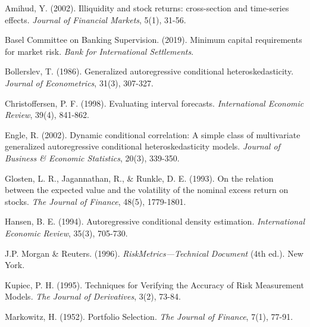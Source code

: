 \documentclass[11pt,a4paper]{article}
\begin{document}
\begin{description}[leftmargin=1cm, labelwidth=0cm, labelindent=0cm, itemindent=-1cm]

    \item Amihud, Y. (2002). Illiquidity and stock returns: cross-section and time-series effects. \textit{Journal of Financial Markets}, 5(1), 31-56.

    \item Basel Committee on Banking Supervision. (2019). Minimum capital requirements for market risk. \textit{Bank for International Settlements}.

    \item Bollerslev, T. (1986). Generalized autoregressive conditional heteroskedasticity. \textit{Journal of Econometrics}, 31(3), 307-327.

    \item Christoffersen, P. F. (1998). Evaluating interval forecasts. \textit{International Economic Review}, 39(4), 841-862.

    \item Engle, R. (2002). Dynamic conditional correlation: A simple class of multivariate generalized autoregressive conditional heteroskedasticity models. \textit{Journal of Business \& Economic Statistics}, 20(3), 339-350.

    \item Glosten, L. R., Jagannathan, R., \& Runkle, D. E. (1993). On the relation between the expected value and the volatility of the nominal excess return on stocks. \textit{The Journal of Finance}, 48(5), 1779-1801.

    \item Hansen, B. E. (1994). Autoregressive conditional density estimation. \textit{International Economic Review}, 35(3), 705-730.

    \item J.P. Morgan \& Reuters. (1996). \textit{RiskMetrics—Technical Document} (4th ed.). New York.

    \item Kupiec, P. H. (1995). Techniques for Verifying the Accuracy of Risk Measurement Models. \textit{The Journal of Derivatives}, 3(2), 73-84.

    \item Markowitz, H. (1952). Portfolio Selection. \textit{The Journal of Finance}, 7(1), 77-91.

\end{description}
\end{document}
